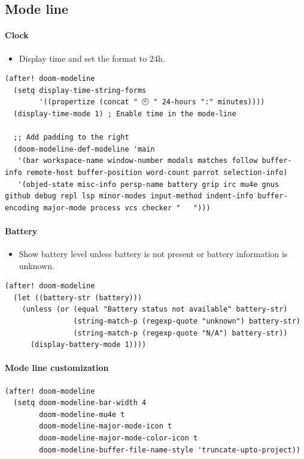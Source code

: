 \documentclass[11pt]{article}
\begin{document}
\subsection{Mode line}
\label{sec:orgd983d9b}
\paragraph{Clock}
\label{sec:org5739211}
\begin{itemize}
\item Display time and set the format to 24h.
\end{itemize}

\begin{verbatim}
(after! doom-modeline
  (setq display-time-string-forms
        '((propertize (concat " 🕘 " 24-hours ":" minutes))))
  (display-time-mode 1) ; Enable time in the mode-line

  ;; Add padding to the right
  (doom-modeline-def-modeline 'main
   '(bar workspace-name window-number modals matches follow buffer-info remote-host buffer-position word-count parrot selection-info)
   '(objed-state misc-info persp-name battery grip irc mu4e gnus github debug repl lsp minor-modes input-method indent-info buffer-encoding major-mode process vcs checker "   ")))
\end{verbatim}

\paragraph{Battery}
\label{sec:org4d888b5}
\begin{itemize}
\item Show battery level unless battery is not present or battery information is unknown.
\end{itemize}

\begin{verbatim}
(after! doom-modeline
  (let ((battery-str (battery)))
    (unless (or (equal "Battery status not available" battery-str)
                (string-match-p (regexp-quote "unknown") battery-str)
                (string-match-p (regexp-quote "N/A") battery-str))
      (display-battery-mode 1))))
\end{verbatim}

\paragraph{Mode line customization}
\label{sec:orga305d14}

\begin{verbatim}
(after! doom-modeline
  (setq doom-modeline-bar-width 4
        doom-modeline-mu4e t
        doom-modeline-major-mode-icon t
        doom-modeline-major-mode-color-icon t
        doom-modeline-buffer-file-name-style 'truncate-upto-project))
\end{verbatim}
\end{document}
